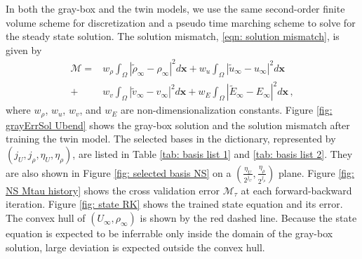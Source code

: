 In both the gray-box and the twin models, we use the same 
second-order finite volume scheme for discretization
and a pseudo time marching scheme to solve for the steady state solution.
The solution mismatch, \eqref{eqn: solution mismatch}, is given by
\begin{equation*}\begin{split}
    \mathcal{M} = &w_\rho \int_\Omega \left|\tilde{\rho}_{\infty} - \rho_{\infty}\right|^2 d\boldsymbol{x}
                + w_u
                \int_\Omega \left|\tilde{u}_{\infty}- u_{\infty}\right|^2 d\boldsymbol{x} \\
                + &w_v
                \int_\Omega \left| \tilde{v}_{\infty}- v_{\infty}\right|^2 d\boldsymbol{x}
                + w_E
                \int_\Omega \left|\tilde{E}_{\infty} - E_\infty\right|^2 d\boldsymbol{x}\,,
    \label{NS mismatch}
\end{split}\end{equation*}
where $w_\rho$, $w_u$, $w_v$, and $w_E$ are non-dimensionalization constants.
Figure \ref{fig: grayErrSol Ubend} shows the gray-box solution and the solution mismatch
after training the twin model.
The selected bases in the
dictionary, represented by $(j_U, j_{\rho}, \eta_U, \eta_\rho)$, are listed in Table 
\ref{tab: basis list 1} and \ref{tab: basis list 2}. 
They are also shown in Figure \ref{fig: selected basis NS} on a 
$(\frac{\eta_U}{2^{j_U}}, \frac{\eta_\rho}{2^{j_\rho}})$ plane.
Figure \ref{fig: NS Mtau history}
shows the cross validation error $\mathcal{M}_{\tau}$ at each forward-backward iteration.
Figure \ref{fig: state RK} shows the trained state equation and its error.
The convex hull of $({U}_\infty, \rho_\infty)$
is shown by the red dashed line.
Because the state equation is expected to be inferrable only inside the domain of the gray-box 
solution, large deviation is expected outside the convex hull.\\



